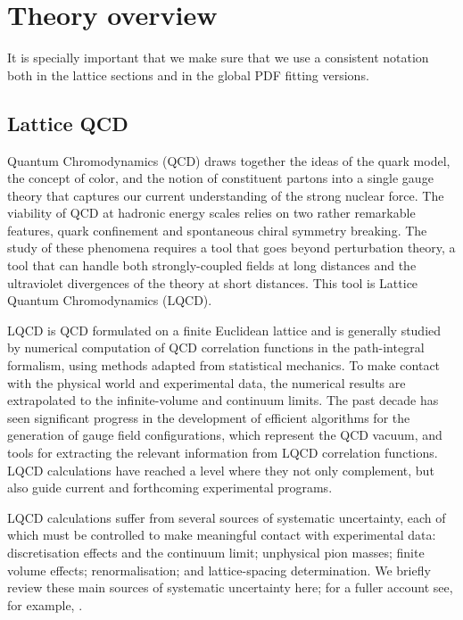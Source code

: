 
\section{Theory overview}
\label{sec:theoryoverview}

It is specially important that we make sure that we use a consistent
notation both in the lattice sections and in the global
PDF fitting versions.

\subsection{Lattice QCD}
\label{Sec:IntroLQCD}
Quantum Chromodynamics (QCD) draws together the ideas of the quark model, the concept of color, and the notion of constituent partons into a single gauge theory that captures our current understanding of the strong nuclear force. The viability of QCD at hadronic energy scales relies on two rather remarkable features, quark confinement and spontaneous chiral symmetry breaking. The study of these phenomena requires a tool that goes beyond perturbation theory, a tool that can handle both strongly-coupled fields at long distances and the ultraviolet divergences of the theory at short distances. This tool is Lattice Quantum Chromodynamics (LQCD).

LQCD is QCD formulated on a finite Euclidean lattice and is generally studied by numerical computation of QCD correlation functions in the path-integral formalism, using methods adapted from statistical mechanics. To make contact with the physical world and experimental data, the numerical results are extrapolated to the infinite-volume and continuum limits. The past decade has seen significant progress in the development of efficient algorithms for the generation of gauge field configurations, which represent the QCD vacuum, and tools for extracting the relevant information from LQCD correlation functions. LQCD calculations have reached a level where they not only complement, but also guide current and forthcoming experimental programs.

LQCD calculations suffer from several sources of systematic uncertainty, each of which must be controlled to make meaningful contact with experimental data: discretisation effects and the continuum limit; unphysical pion masses; finite volume effects; renormalisation; and lattice-spacing determination. We briefly review these main sources of systematic uncertainty here; for a fuller account see, for example, \cite{Aoki:2016frl}.

